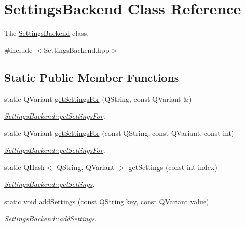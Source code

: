 \hypertarget{classSettingsBackend}{\section{Settings\+Backend Class Reference}
\label{classSettingsBackend}
}


The \hyperlink{classSettingsBackend}{Settings\+Backend} class.  




{\ttfamily \#include $<$Settings\+Backend.\+hpp$>$}

\subsection*{Static Public Member Functions}
\begin{DoxyCompactItemize}
\item 
static Q\+Variant \hyperlink{classSettingsBackend_aa88d1c980c78acfcb67fb3d76e8a9e0f}{get\+Settings\+For} (Q\+String, const Q\+Variant \&)
\begin{DoxyCompactList}\small\item\em \hyperlink{classSettingsBackend_aa88d1c980c78acfcb67fb3d76e8a9e0f}{Settings\+Backend\+::get\+Settings\+For}. \end{DoxyCompactList}\item 
static Q\+Variant \hyperlink{classSettingsBackend_a654a3528f4142036f90c87bdc6637ce5}{get\+Settings\+For} (const Q\+String, const Q\+Variant, const int)
\begin{DoxyCompactList}\small\item\em \hyperlink{classSettingsBackend_aa88d1c980c78acfcb67fb3d76e8a9e0f}{Settings\+Backend\+::get\+Settings\+For}. \end{DoxyCompactList}\item 
static Q\+Hash$<$ Q\+String, Q\+Variant $>$ \hyperlink{classSettingsBackend_a3dbcf97357969ab42f347d8e4e9a9ca4}{get\+Settings} (const int index)
\begin{DoxyCompactList}\small\item\em \hyperlink{classSettingsBackend_a3dbcf97357969ab42f347d8e4e9a9ca4}{Settings\+Backend\+::get\+Settings}. \end{DoxyCompactList}\item 
static void \hyperlink{classSettingsBackend_a674c2b36fbd38622c79c47b3bcb60e68}{add\+Settings} (const Q\+String key, const Q\+Variant value)
\begin{DoxyCompactList}\small\item\em \hyperlink{classSettingsBackend_a674c2b36fbd38622c79c47b3bcb60e68}{Settings\+Backend\+::add\+Settings}. \end{DoxyCompactList}\item 

\end{DoxyCompactItemize}
